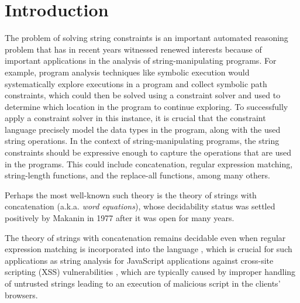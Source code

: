
\section{Introduction}

The problem of %
solving string constraints
is an important automated reasoning problem that has in recent years witnessed
renewed interests %
\cite{Berkeley-JavaScript,TCJ16,LB16,YABI14,S3,Abdulla14,Abdulla17} because of 
important applications in the analysis of 
string-manipulating programs. For example,
program analysis techniques like symbolic execution \cite{king76,DART,EXE} 
would
systematically explore executions in a program and collect symbolic path 
constraints, which could then be solved using a constraint solver and
used to determine which location in the program to continue exploring.
To successfully apply a constraint solver in this instance, it is
crucial that the constraint language precisely model the data types in the
program, along with the used string operations. In the context of
string-manipulating programs, the string constraints should be expressive enough
to capture the operations that are used in the programs. This could include 
concatenation, regular expression matching, string-length functions, and
the replace-all functions, among many others.

Perhaps the most well-known
such theory is the theory of strings with concatenation (a.k.a. \emph{word 
equations}),
whose decidability status was settled positively by Makanin \cite{Makanin}
in 1977 after it was open for many years. %


The theory of strings with concatenation remains 
decidable even when regular expression matching is incorporated into the 
language \cite{??}, which is crucial for such applications as string analysis
for JavaScript applications against cross-site scripting (XSS) vulnerabilities
\cite{Berkeley-JavaScript}, which are typically caused by improper handling
of untrusted strings leading to an execution of malicious script in the
clients' browsers.

